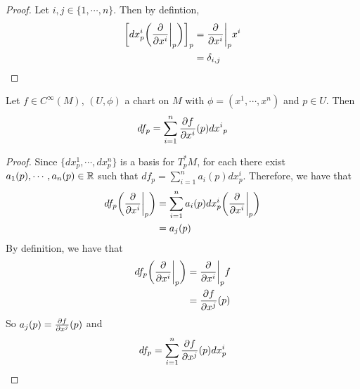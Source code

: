 \documentclass{book}
\begin{document}
	\begin{proof}
		Let $i,j \in \{1, \cdots, n\}$. Then  by defintion,
		\begin{align*}
			\bigg[ dx^i_p \bigg (\frac{\partial}{\partial x^i} \bigg|_p \bigg ) \bigg]_p 
			& = \frac{\partial}{\partial x^i} \bigg|_p x^i \\
			& = \delta_{i,j} \\
		\end{align*}
	\end{proof}
	
	\begin{ex}
		Let $f \in C^{\infty}(M)$, $(U, \phi)$ a chart on $M$ with $\phi = (x^1, \cdots, x^n)$ and $p \in U$. Then $$df_p = \sum_{i=1}^n \frac{\partial f}{\partial x^i}(p) {dx^i}_p$$
	\end{ex}

	\begin{proof}
		 Since $\{dx^1_p, \cdots, dx^n_p\}$ is a basis for $T^*_pM$, for each there exist $a_1(p), \cdots, a_n(p) \in \mathbb{R}$ such that $df_p = \sum\limits_{i=1}^n a_i(p)dx^i_p$. Therefore, we have that 
		\begin{align*}
			df_p \bigg(\frac{\partial}{\partial x^i} \bigg|_p \bigg) 
			& = \sum\limits_{i=1}^n a_i(p)dx^i_p \bigg(\frac{\partial}{\partial x^i} \bigg|_p \bigg)  \\
			& =  a_j(p)
		\end{align*}
		By definition, we have that 
		\begin{align*}
			df_p\bigg(\frac{\partial}{\partial x^i} \bigg|_p \bigg) 
			& = \frac{\partial}{\partial x^i} \bigg|_p f \\ 
			& = \frac{\partial f}{\partial x^j}(p)\\
		\end{align*}
		So $a_j(p) = \frac{\partial f}{\partial x^j} (p)$ and $$df_p = \sum\limits_{i=1}^n \frac{\partial f}{\partial x^j} (p)dx^i_p$$
	\end{proof}
		
	
	
	
	
	
	
	
	
	
	
	
	
	
	
	
	
	
	
	
	
	
	
	
	
	
	
	
	
	
	
	
	
\end{document}
